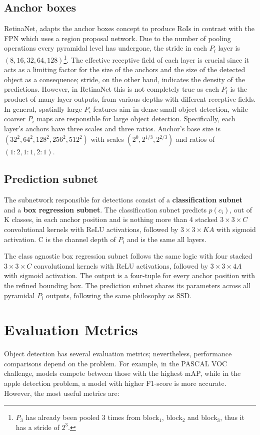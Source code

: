 \subsection{Anchor boxes}
RetinaNet, adapts the anchor boxes concept to produce RoIs in contrast with the FPN which uses a region proposal network. Due to the number of pooling operations every pyramidal level has undergone, the stride in each $P_i$ layer is $(8, 16, 32, 64, 128)$\footnote{$P_3$ has already been pooled 3 times from block$_1$, block$_2$ and block$_3$, thus it has a stride of $2^3$.}. The effective receptive field of each layer is crucial since it acts as a limiting factor for the size of the anchors and the size of the detected object as a consequence; stride, on the other hand, indicates the density of the predictions. However, in RetinaNet this is not completely true as each $P_i$ is the product of many layer outputs, from various depths with different receptive fields. In general, spatially large $P_i$ features aim in dense small object detection, while coarser $P_i$ maps are responsible for large object detection. Specifically, each layer's anchors have three scales and three ratios. Anchor's base size is $(32^2, 64^2, 128^2, 256^2, 512^2)$ with scales $(2^0, 2^{1/3}, 2^{2/3})$ and ratios of $(1\!:\!2,1\!:\!1,2\!:\!1)$.

\subsection{Prediction subnet}
The subnetwork responsible for detections consist of a \textbf{classification subnet} and a \textbf{box regression subnet}. The classification subnet predicts $p(c_i)$, out of K classes, in each anchor position and is nothing more than 4 stacked $3\times3\times C$ convolutional kernels with ReLU activations, followed by  $3\times3\times KA$ with sigmoid activation. C is the channel depth of $P_i$ and is the same all layers.

The class agnostic box regression subnet follows the same logic with four stacked $3\times3\times C$ convolutional kernels with ReLU activations, followed by $3\times3\times 4A$ with sigmoid activation. The output is a four-tuple for every anchor position with the refined bounding box. The prediction subnet shares its parameters across all pyramidal $P_i$ outputs, following the same philosophy as SSD.

\section{Evaluation Metrics}
Object detection has several evaluation metrics; nevertheless, performance comparisons depend on the problem. For example, in the PASCAL VOC challenge, models compete between those with the highest mAP, while in the apple detection problem, a model with higher F1-score is more accurate. However, the most useful metrics are:

